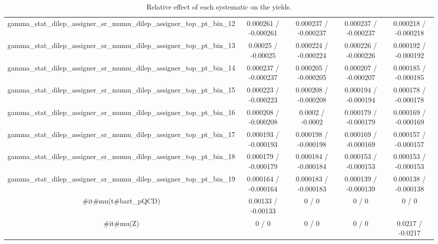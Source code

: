 \documentclass[10pt]{article}
\begin{document}
\begin{table}[htbp]
\begin{center}
\begin{tabular}{|c|c|c|c|c|}
  gamma_stat_dilep_assigner_sr_mumu_dilep_assigner_top_pt_bin_12 & 0.000261 / -0.000261 & 0.000237 / -0.000237 & 0.000237 / -0.000237 & 0.000218 / -0.000218 \\ 
  gamma_stat_dilep_assigner_sr_mumu_dilep_assigner_top_pt_bin_13 & 0.00025 / -0.00025 & 0.000224 / -0.000224 & 0.000226 / -0.000226 & 0.000192 / -0.000192 \\ 
  gamma_stat_dilep_assigner_sr_mumu_dilep_assigner_top_pt_bin_14 & 0.000237 / -0.000237 & 0.000205 / -0.000205 & 0.000207 / -0.000207 & 0.000185 / -0.000185 \\ 
  gamma_stat_dilep_assigner_sr_mumu_dilep_assigner_top_pt_bin_15 & 0.000223 / -0.000223 & 0.000208 / -0.000208 & 0.000194 / -0.000194 & 0.000178 / -0.000178 \\ 
  gamma_stat_dilep_assigner_sr_mumu_dilep_assigner_top_pt_bin_16 & 0.000208 / -0.000208 & 0.0002 / -0.0002 & 0.000179 / -0.000179 & 0.000169 / -0.000169 \\ 
  gamma_stat_dilep_assigner_sr_mumu_dilep_assigner_top_pt_bin_17 & 0.000193 / -0.000193 & 0.000198 / -0.000198 & 0.000169 / -0.000169 & 0.000157 / -0.000157 \\ 
  gamma_stat_dilep_assigner_sr_mumu_dilep_assigner_top_pt_bin_18 & 0.000179 / -0.000179 & 0.000184 / -0.000184 & 0.000153 / -0.000153 & 0.000153 / -0.000153 \\ 
  gamma_stat_dilep_assigner_sr_mumu_dilep_assigner_top_pt_bin_19 & 0.000164 / -0.000164 & 0.000183 / -0.000183 & 0.000139 / -0.000139 & 0.000138 / -0.000138 \\ 
  #it{#mu}(t#bar{t}_{pQCD}) & 0.00133 / -0.00133 & 0 / 0 & 0 / 0 & 0 / 0 \\ 
  #it{#mu}(Z) & 0 / 0 & 0 / 0 & 0 / 0 & 0.0217 / -0.0217 \\ 
\hline 
\end{tabular} 
\caption{Relative effect of each systematic on the yields.} 
\end{center} 
\end{table} 
\end{document}
